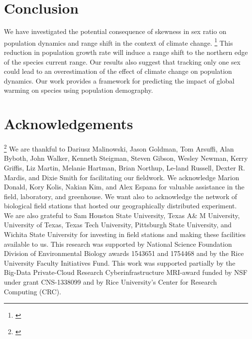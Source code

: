\documentclass[12pt]{article}\usepackage[]{graphicx}\usepackage[dvipsnames]{xcolor}
\newcommand{\tom}[2]{{\color{red}{#1}}\footnote{\textit{\color{red}{#2}}}}
\begin{document}
\section*{Conclusion}
We have investigated the potential consequence of skewness in sex ratio on population dynamics and range shift in the context of climate change. 
\tom{We found that future climate will affect population growth rate at the center of species range.}{I do not follow what this is referring to.}
This reduction in population growth rate will induce a range shift to the northern edge of the species current range. 
Our results also suggest that tracking only one sex could lead to an overestimation of the effect of climate change on population dynamics. 
Our work  provides a framework for predicting the impact of global warming on species using population demography. 

\section*{Acknowledgements}
\tom{}{Much of this looks like it is copied from the Am Nat paper.}
We are thankful to Dariusz Malinowski, Jason Goldman, Tom Arsuffi, Alan Byboth, John Walker, Kenneth Steigman, Steven Gibson, Wesley Newman, Kerry Griffis, Liz Martin, Melanie Hartman, Brian Northup, Le-land Russell, Dexter R. Mardis, and Dixie Smith for facilitating our fieldwork. 
We acknowledge Marion Donald, Kory Kolis, Nakian Kim, and Alex Espana for valuable assistance in the field, laboratory, and greenhouse. 
We want also to acknowledge the network of biological field stations that hosted our geographically distributed experiment. 
We are also grateful to Sam Houston State University, Texas A\& M University, University of Texas, Texas Tech University, Pittsburgh State University, and Wichita State University for investing in field stations and making these facilities available to us. 
This research was supported by National Science Foundation Division of Environmental Biology awards 1543651 and 1754468 and by the Rice University Faculty Initiatives Fund.
This work was supported partially by the Big-Data Private-Cloud Research Cyberinfrastructure MRI-award funded by NSF under grant CNS-1338099 and by Rice University's Center for Research Computing (CRC).


\newpage


\newpage
\clearpage 
\setcounter{equation}{0}
\setcounter{figure}{0}
\setcounter{section}{0}
\setcounter{table}{0}
\renewcommand{\theequation}{S.\arabic{equation}}
\renewcommand{\thetable}{S-\arabic{table}}
\renewcommand{\thefigure}{S-\arabic{figure}}
\renewcommand{\thesection}{S.\arabic{section}}
\end{document}
